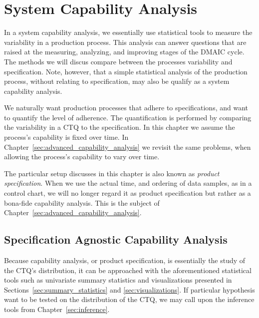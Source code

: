 
\chapter{System Capability Analysis}
\label{sec:capability_analysis}



In a system capability analysis, we essentially use statistical tools to measure the variability in a production process.
This analysis can answer questions that are raised at the measuring, analyzing, and improving stages of the DMAIC cycle. 
The methods we will discus compare between the processes variability and specification. 
Note, however, that a simple statistical analysis of the production process, without relating to specification, may also be qualify as a system capability analysis.

We naturally want production processes that adhere to specifications, and want to quantify the level of adherence.
The quantification is performed by comparing the variability in a CTQ to the specification.
In this chapter we assume the process’s capability is fixed over time. 
In Chapter~\ref{sec:advanced_capability_analysis} we revisit the same problems, when allowing the process’s capability to vary over time. 

The particular setup discusses in this chapter is also known as \emph{product specification}.
When we use the actual time, and ordering of data samples, as in a control chart, we will no longer regard it as product specification but rather as a bona-fide capability analysis. This is the subject of Chapter~\ref{sec:advanced_capability_analysis}.
 
 
\section{Specification Agnostic Capability Analysis}
 
Because capability analysis, or product specification, is essentially the study of the CTQ's distribution, it can be approached with the aforementioned statistical tools such as univariate summary statistics and visualizations presented in Sections~\ref{sec:summary_statistics} and \ref{sec:visualizations}.
If particular hypothesis want to be tested on the distribution of the CTQ, we may call upon the inference tools from Chapter~\ref{sec:inference}.

